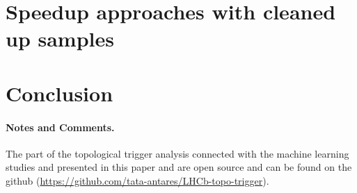 \documentclass{llncs}
\begin{document}
\section{Speedup approaches with cleaned up samples}

\section{Conclusion}

\paragraph{Notes and Comments.}
The part of the topological trigger analysis connected with the machine learning studies and presented in this paper and \cite{run2_topo} are open source and can be found on the github (\url{https://github.com/tata-antares/LHCb-topo-trigger}).
%
%
\end{document}
